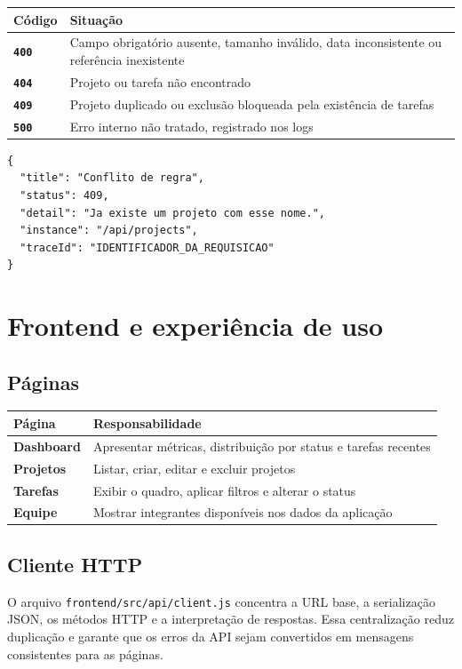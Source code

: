 \documentclass[12pt,a4paper,openany]{report}
\begin{document}
\begin{tabularx}{\textwidth}{>{\bfseries}p{} X}
\toprule
Código & Situação \\
\midrule
\texttt{400} & Campo obrigatório ausente, tamanho inválido, data inconsistente ou referência inexistente \\
\texttt{404} & Projeto ou tarefa não encontrado \\
\texttt{409} & Projeto duplicado ou exclusão bloqueada pela existência de tarefas \\
\texttt{500} & Erro interno não tratado, registrado nos logs \\
\bottomrule
\end{tabularx}

\begin{lstlisting}
{
  "title": "Conflito de regra",
  "status": 409,
  "detail": "Ja existe um projeto com esse nome.",
  "instance": "/api/projects",
  "traceId": "IDENTIFICADOR_DA_REQUISICAO"
}
\end{lstlisting}

\chapter{Frontend e experiência de uso}

\section{Páginas}

\begin{tabularx}{\textwidth}{>{\bfseries}p{} X}
\toprule
Página & Responsabilidade \\
\midrule
Dashboard & Apresentar métricas, distribuição por status e tarefas recentes \\
Projetos & Listar, criar, editar e excluir projetos \\
Tarefas & Exibir o quadro, aplicar filtros e alterar o status \\
Equipe & Mostrar integrantes disponíveis nos dados da aplicação \\
\bottomrule
\end{tabularx}

\section{Cliente HTTP}

O arquivo \texttt{frontend/src/api/client.js} concentra a URL base, a serialização JSON, os métodos HTTP e a interpretação de respostas. Essa centralização reduz duplicação e garante que os erros da API sejam convertidos em mensagens consistentes para as páginas.
\end{document}

